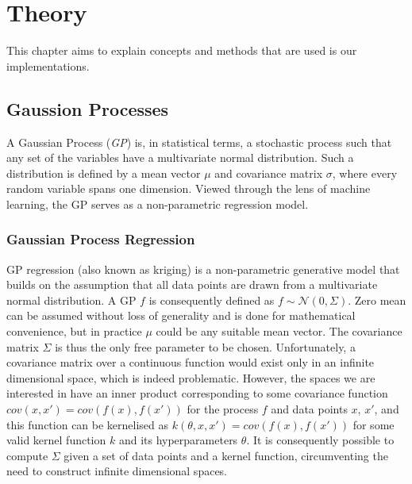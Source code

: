 \chapter{Theory}
\label{cha:theory}
This chapter aims to explain concepts and methods that are used is our implementations.

\section{Gaussion Processes}
A Gaussian Process (\textit{GP}) is, in statistical terms, a stochastic process such that any set of the variables have a multivariate normal distribution. Such a distribution is defined by a mean vector $\mu$ and covariance matrix $\sigma$, where every random variable spans one dimension. Viewed through the lens of machine learning, the GP serves as a non-parametric regression model.

\subsection{Gaussian Process Regression}
GP regression (also known as kriging) is a non-parametric generative model that builds on the assumption that all data points are drawn from a multivariate normal distribution. A GP $f$ is consequently defined as $f \sim \mathcal{N}(0, \Sigma)$. Zero mean can be assumed without loss of generality and is done for mathematical convenience, but in practice $\mu$ could be any suitable mean vector. The covariance matrix $\Sigma$ is thus the only free parameter to be chosen. Unfortunately, a covariance matrix over a continuous function would exist only in an infinite dimensional space, which is indeed problematic. However, the spaces we are interested in have an inner product corresponding to some covariance function $cov(x, x') = cov(f(x), f(x'))$ for the process $f$ and data points $x$, $x'$, and this function can be kernelised as $k(\theta, x, x') = cov(f(x), f(x'))$ for some valid kernel function $k$ and its hyperparameters $\theta$. It is consequently possible to compute $\Sigma$ given a set of data points and a kernel function, circumventing the need to construct infinite dimensional spaces.

